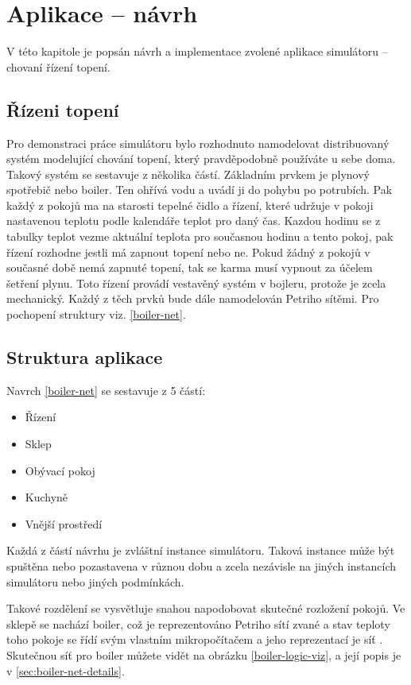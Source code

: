 \chapter{Aplikace -- návrh}
\label{chap:app-arch}

V této kapitole je popsán návrh a implementace zvolené aplikace simulátoru -- chovaní řízení topení.

\section{Řízeni topení}
\label{sec:tepelne-rizeni}

Pro demonstraci práce simulátoru bylo rozhodnuto namodelovat distribuovaný systém modelující chování topení, který pravděpodobně používáte u sebe doma. Takový systém se sestavuje z několika částí. Základním prvkem je plynový spotřebič nebo boiler. Ten ohřívá vodu a uvádí ji do pohybu po potrubích. Pak každý z pokojů ma na starosti tepelné čidlo a řízení, které udržuje v pokoji nastavenou teplotu podle kalendáře teplot pro daný čas. Kazdou hodinu se z tabulky teplot vezme aktuální teplota pro současnou hodinu a tento pokoj, pak řízení rozhodne jestli má zapnout topení nebo ne. Pokud žádný z pokojů v současné době nemá zapnuté topení, tak se karma musí vypnout za účelem šetření plynu. Toto řízení provádí vestavěný systém v bojleru, protože je zcela mechanický. Každý z těch prvků bude dále namodelován Petriho sítěmi. Pro pochopení struktury viz. \ref{boiler-net}.

\section{Struktura aplikace}

Navrch \ref{boiler-net} se sestavuje z 5 částí:
\begin{itemize}
 \item Řízení
 \item Sklep
 \item Obývací pokoj
 \item Kuchyně
 \item Vnější prostředí
\end{itemize}
Každá z částí návrhu je zvláštní instance simulátoru. Taková instance může být spuštěna nebo pozastavena v různou dobu a zcela nezávisle na jiných instancích simulátoru nebo jiných podmínkách.

Takové rozdělení se vysvětluje snahou napodobovat skutečné rozložení pokojů. Ve sklepě se nachází boiler, což je reprezentováno Petriho sítí zvané  a stav teploty toho pokoje se řídí svým vlastním mikropočítačem a jeho reprezentací je síť . Skutečnou síť pro boiler můžete vidět na obrázku \ref{boiler-logic-viz}, a její popis je v \ref{sec:boiler-net-details}.

